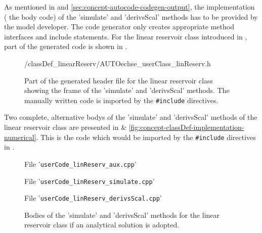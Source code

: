As mentioned in  and \ref{sec:concept-autocode-codegen-output}, the implementation (\ie{} the body code) of the 'simulate' and 'derivsScal' methods has to be provided by the model developer. The code generator only creates appropriate method interfaces and include statements. For the linear reservoir class introduced in , part of the generated code is shown in .

\begin{figure*}
   {\figdir/classDef_linearReserv/AUTOechse_userClass_linReserv.h}
  \caption{Part of the generated header file for the linear reservoir class showing the frame of the 'simulate' and 'derivsScal' methods. The manually written code is imported by the \texttt{\#include} directives. \label{fig:concept-classDef-methodsFrame}}
\end{figure*}

Two complete, alternative bodys of the 'simulate' and 'derivsScal' methods of the linear reservoir class are presented in   \& \ref{fig:concept-classDef-implementation-numerical}. This is the code which would be imported by the \verb!#include! directives in .

\begin{figure*}
  File '\verb!userCode_linReserv_aux.cpp!'
  
  File '\verb!userCode_linReserv_simulate.cpp!'
  
  File '\verb!userCode_linReserv_derivsScal.cpp!'
  
  \caption[Bodies of the 'simulate' and 'derivsScal' methods for the linear reservoir class if an analytical solution is adopted.]{Bodies of the 'simulate' and 'derivsScal' methods for the linear reservoir class if an analytical solution is adopted. \label{fig:concept-classDef-implementation-analytical}}
\end{figure*}

